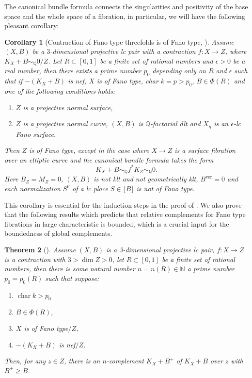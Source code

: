 \documentclass[letterpaper,reqno,12pt]{amsart}
\DeclareMathOperator{\chara}{char}
\numberwithin{equation}{section}
\theoremstyle{plain}
\newtheorem{theorem}{Theorem}[section]
\newtheorem{corollary}[theorem]{Corollary}
\begin{document}
The canonical bundle formula connects the singularities and positivity of the base space and the whole space of a fibration, in particular, we will have the following pleasant corollary:
\begin{corollary}[Contraction of Fano type threefolds is of Fano type, ]
\label{contrac}
    Assume $(X,B)$ be a $3$-dimensional projective lc pair with a contraction $f:X\to Z$, where $K_X+B\sim_{{\mathbb Q}}0/Z$. Let $R\subset [0,1]$ be a finite set of rational numbers and $\epsilon>0$ be a real number, then there exists a prime number $p_0$ depending only on $R$ and $\epsilon$ such that if $-(K_X+B)$ is nef, $X$ is of Fano type, char $k=p>p_0$, $B\in\Phi(R)$ and one of the following conditions holds:
    \begin{enumerate}
        \item $Z$ is a projective normal surface,
        \item $Z$ is a projective normal curve, $(X,B)$ is $\mathbb Q$-factorial dlt and $X_\eta$ is an $\epsilon$-lc Fano surface.
    \end{enumerate}
    Then $Z$ is of Fano type, except in the case where $X\to Z$ is a surface fibration over an elliptic curve and the canonical bundle formula takes the form 
    \[K_X+B\sim_\mathbb Qf^*K_Z\sim_\mathbb Q0.\]
    Here $B_Z=M_Z=0$, $(X,B)$ is not klt and not geometrically klt, $B^\text{ver}=0$ and each normalization $S^\nu$ of a lc place $S\in\lfloor B\rfloor$ is not of Fano type.
\end{corollary}

This corollary is essential for the induction steps in the proof of . We also prove that the following results which predicts that relative complements for Fano type fibrations in large characteristic is bounded, which is a crucial input for the boundedness of global complements.

\begin{theorem}[]
\label{relcomp}
    Assume $(X,B)$ is a 3-dimensional projective lc pair, $f:X\to Z$ is a contraction with $3>\dim Z>0$, let $R\subset [0,1]$ be a finite set of rational numbers, then there is some natural number $n=n(R)\in\mathbb N$ a prime number $p_0=p_0(R)$ such that suppose:
    \begin{enumerate}
        \item $\chara k>p_0$
        \item $B\in\Phi(R)$,
        \item $X$ is of Fano type$/Z$,
        \item $-(K_X+B)$ is nef$/Z$.
    \end{enumerate}
    Then, for any $z\in Z$, there is an $n$-complement $K_X+B^+$ of $K_X+B$ over $z$ with $B^+\geq B$.
\end{theorem}
\end{document}
